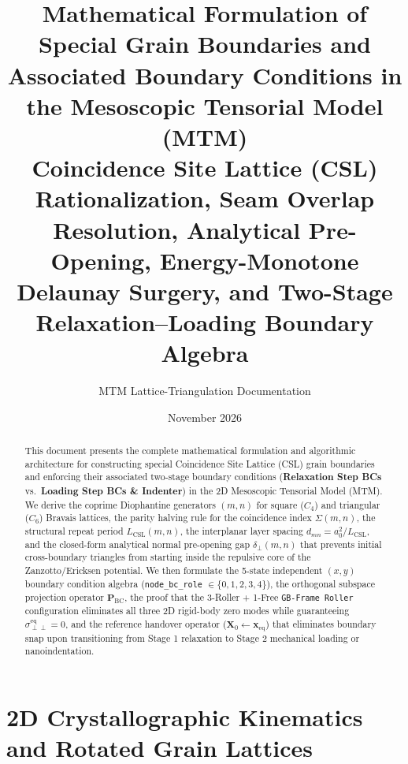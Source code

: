 \documentclass[11pt,a4paper]{article}
\title{\textbf{Mathematical Formulation of Special Grain Boundaries and Associated Boundary Conditions in the Mesoscopic Tensorial Model (MTM)}\\[6pt]
\large Coincidence Site Lattice (CSL) Rationalization, Seam Overlap Resolution, Analytical Pre-Opening, Energy-Monotone Delaunay Surgery, and Two-Stage Relaxation--Loading Boundary Algebra}
\author{MTM Lattice-Triangulation Documentation}
\date{November 2026}
\newcommand{\code}[1]{\texttt{#1}}
\begin{document}
\maketitle

\begin{abstract}
\noindent
This document presents the complete mathematical formulation and algorithmic architecture for constructing special Coincidence Site Lattice (CSL) grain boundaries and enforcing their associated two-stage boundary conditions (\textbf{Relaxation Step BCs} vs.\ \textbf{Loading Step BCs \& Indenter}) in the 2D Mesoscopic Tensorial Model (MTM). We derive the coprime Diophantine generators $(m,n)$ for square ($C_4$) and triangular ($C_6$) Bravais lattices, the parity halving rule for the coincidence index $\Sigma(m,n)$, the structural repeat period $L_{\text{CSL}}(m,n)$, the interplanar layer spacing $d_{mn} = a_0^2 / L_{\text{CSL}}$, and the closed-form analytical normal pre-opening gap $\delta_\perp(m,n)$ that prevents initial cross-boundary triangles from starting inside the repulsive core of the Zanzotto/Ericksen potential. We then formulate the 5-state independent $(x,y)$ boundary condition algebra (\code{node\_bc\_role} $\in \{0,1,2,3,4\}$), the orthogonal subspace projection operator $\mathbf{P}_{\text{BC}}$, the proof that the 3-Roller + 1-Free \code{GB-Frame Roller} configuration eliminates all three 2D rigid-body zero modes while guaranteeing $\sigma_{\perp\perp}^{\text{eq}} = 0$, and the reference handover operator ($\mathbf{X}_0 \leftarrow \mathbf{x}_{\text{eq}}$) that eliminates boundary snap upon transitioning from Stage 1 relaxation to Stage 2 mechanical loading or nanoindentation.
\end{abstract}

\tableofcontents

\section{2D Crystallographic Kinematics and Rotated Grain Lattices}
\end{document}
